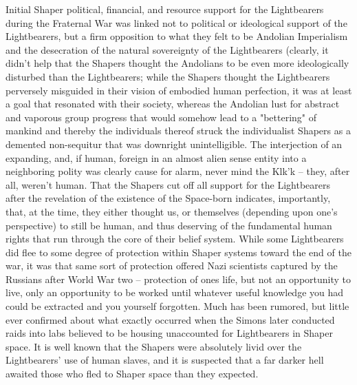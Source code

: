 Initial Shaper political, financial, and resource support for the
Lightbearers during the Fraternal War was linked not to political or
ideological support of the Lightbearers, but a firm opposition to what
they felt to be Andolian Imperialism and the desecration of the
natural sovereignty of the Lightbearers (clearly, it
didn't help that the Shapers thought the Andolians to be even more
ideologically disturbed than the Lightbearers; while the Shapers
thought the Lightbearers perversely misguided in their vision of
embodied human perfection, it was at least a goal that resonated with
their society, whereas the Andolian lust for abstract and vaporous
group progress that would somehow lead to a "bettering" of mankind
and thereby the individuals thereof struck the individualist Shapers
as a demented non-sequitur that was downright unintelligible. The
interjection of an expanding, and, if human, foreign in an almost
alien sense entity into a neighboring polity was clearly cause for
alarm, never mind the Klk'k -- they, after all, weren't human. That the Shapers cut off all support for the Lightbearers
after the revelation of the existence of the Space-born indicates,
importantly, that, at the time, they either thought us, or themselves
(depending upon one's perspective) to still be human, and thus
deserving of the fundamental human rights that run through the core of
their belief system. While some Lightbearers did flee to some degree
of protection within Shaper systems toward the end of the war, it was
that same sort of protection offered Nazi scientists captured by the
Russians after World War two -- protection of ones
life, but not an opportunity to live, only an opportunity to be worked
until whatever useful knowledge you had could be extracted and you
yourself forgotten. Much has been rumored, but little ever confirmed
about what exactly occurred when the Simons later conducted raids into
labs believed to be housing unaccounted for Lightbearers in Shaper
space. It is well known that the Shapers were absolutely livid over
the Lightbearers' use of human slaves, and it is suspected that a far
darker hell awaited those who fled to Shaper space than they expected.

